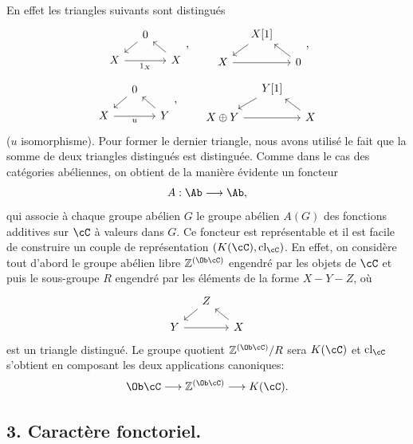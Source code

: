 En
effet les triangles suivants sont distingués
\[
\begin{tikzcd}[column sep=small,row sep=small]
&0 \arrow[dl]\\ X \arrow[rr,"1_X"']&&X\arrow[ul]
\end{tikzcd},
\qquad
\begin{tikzcd}[column sep=small,row sep=small]
&X[1]\arrow[dl]\\ X\arrow[rr]&&0\arrow[ul]
\end{tikzcd},
\]
\[
\begin{tikzcd}[column sep=small,row sep=small]
&0\arrow[dl]\\ X\arrow[rr,"u"']&&Y\arrow[ul]
\end{tikzcd},
\qquad
\begin{tikzcd}[column sep=small,row sep=small]
&Y[1]\arrow[dl]\\ X\oplus Y\arrow[rr]&&X\arrow[ul]
\end{tikzcd}
\]
($u$ isomorphisme). Pour former le dernier triangle, nous avons utilisé le fait que la somme de deux triangles distingués est distinguée. Comme dans le cas des catégories abéliennes, on obtient de la manière évidente un foncteur
\[
A:\Ab\longrightarrow\Ab,
\]
qui associe à chaque groupe abélien $G$ le groupe abélien $A(G)$ des fonctions additives sur $\cC$ à valeurs dans $G$. Ce foncteur est représentable et il est facile de construire un couple de représentation $(K(\cC),\operatorname{cl}_{\cC})$. En effet, on considère tout d'abord le groupe abélien libre $\mathbb{Z}^{(\Ob\cC)}$ engendré par les objets de $\cC$ et puis le sous-groupe $R$ engendré par les éléments de la forme $X-Y-Z$, où
\[
\begin{tikzcd}[column sep=small,row sep=small]
&Z\arrow[dl]\\ Y\arrow[rr]&&X\arrow[ul]
\end{tikzcd}
\]
est un triangle distingué. Le groupe quotient $\mathbb{Z}^{(\Ob\cC)}/R$ sera $K(\cC)$ et $\operatorname{cl}_{\cC}$ s'obtient en composant les deux applications canoniques:
\[
\Ob\cC\longrightarrow \mathbb{Z}^{(\Ob\cC)}\longrightarrow K(\cC).
\]

\subsection*{3. Caractère fonctoriel.}

